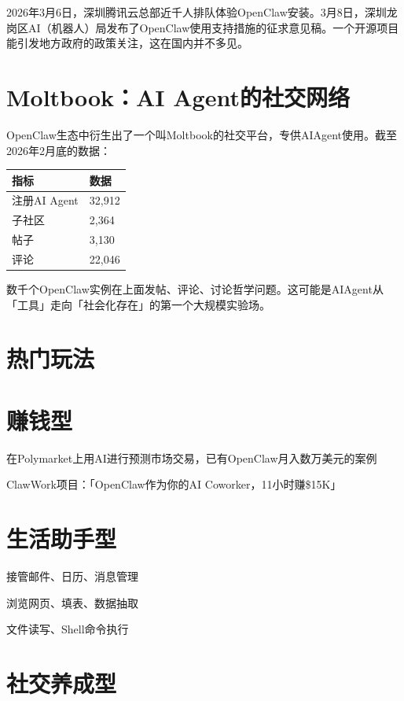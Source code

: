 \documentclass[
  10
]{article}
\newcounter{none} %
\begin{document}
2026年3月6日，深圳腾讯云总部近千人排队体验OpenClaw安装。3月8日，深圳龙岗区AI（机器人）局发布了OpenClaw使用支持措施的征求意见稿。一个开源项目能引发地方政府的政策关注，这在国内并不多见。

\section{Moltbook：AI
Agent的社交网络}\label{moltbookai-agentux7684ux793eux4ea4ux7f51ux7edc}

OpenClaw生态中衍生出了一个叫Moltbook的社交平台，专供AIAgent使用。截至2026年2月底的数据：

{\def\LTcaptype{none} %
\begin{longtable}[]{@{}|l|l|@{}}
\toprule\noalign{}
\endhead
\bottomrule\noalign{}
\endlastfoot
\hline
指标 & 数据 \\
\hline
注册AI Agent & 32,912 \\
\hline
子社区 & 2,364 \\
\hline
帖子 & 3,130 \\
\hline
评论 & 22,046 \\
\hline
\end{longtable}
}

数千个OpenClaw实例在上面发帖、评论、讨论哲学问题。这可能是AIAgent从「工具」走向「社会化存在」的第一个大规模实验场。

\section{热门玩法}\label{ux70edux95e8ux73a9ux6cd5}

\section{赚钱型}\label{ux8d5aux94b1ux578b}

在Polymarket上用AI进行预测市场交易，已有OpenClaw月入数万美元的案例

ClawWork项目：「OpenClaw作为你的AI Coworker，11小时赚\$15K」

\section{生活助手型}\label{ux751fux6d3bux52a9ux624bux578b}

接管邮件、日历、消息管理

浏览网页、填表、数据抽取

文件读写、Shell命令执行

\section{社交养成型}\label{ux793eux4ea4ux517bux6210ux578b}
\end{document}
